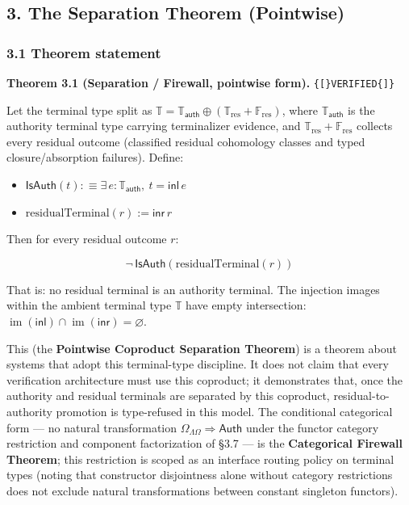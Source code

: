 \documentclass[
  10pt,
]{article}
\providecommand{\tightlist}{%
  \setlength{\itemsep}{0pt}\setlength{\parskip}{0pt}}
\providecommand{\tightlist}{%
  \setlength{\itemsep}{0pt}\setlength{\parskip}{0pt}}
\DeclareRobustCommand{\texttt}[1]{{\paperSymbolFont\nolinkurl{#1}}}
\begin{document}
\subsection{3. The Separation Theorem (Pointwise)}\label{the-separation-theorem-pointwise}

\subsubsection{3.1 Theorem statement}\label{theorem-statement}

\textbf{Theorem 3.1 (Separation / Firewall, pointwise form).} \texttt{{[}VERIFIED{]}}

Let the terminal type split as \protect\hypertarget{math-E0040-0055}{}{\(\mathbb{T} = \mathbb{T}_{\mathsf{auth}} \oplus (\mathbb{T}_{\mathrm{res}} + \mathbb{F}_{\mathrm{res}})\)}, where \protect\hypertarget{math-E0029-0056}{}{\(\mathbb{T}_{\mathsf{auth}}\)} is the authority terminal type carrying terminalizer evidence, and \protect\hypertarget{math-E0008-0057}{}{\(\mathbb{T}_{\mathrm{res}} + \mathbb{F}_{\mathrm{res}}\)} collects every residual outcome (classified residual cohomology classes and typed closure/absorption failures). Define:

\begin{itemize}
\tightlist
\item
  \protect\hypertarget{math-E0041-0058}{}{\(\mathsf{IsAuth}(t) :\equiv \exists\, e : \mathbb{T}_{\mathsf{auth}},\ t = \mathsf{inl}\,e\)}
\item
  \protect\hypertarget{math-E0042-0059}{}{\(\mathrm{residualTerminal}(r) := \mathsf{inr}\,r\)}
\end{itemize}

Then for every residual outcome \protect\hypertarget{math-E0043-0060}{}{\(r\)}:

\protect\hypertarget{math-E0044-0061}{}{\[\neg\,\mathsf{IsAuth}(\mathrm{residualTerminal}(r))\]}

That is: no residual terminal is an authority terminal. The injection images within the ambient terminal type \protect\hypertarget{math-E0045-0062}{}{\(\mathbb{T}\)} have empty intersection: \protect\hypertarget{math-E0046-0063}{}{\(\operatorname{im}(\mathsf{inl}) \cap \operatorname{im}(\mathsf{inr}) = \varnothing\)}.

This (the \textbf{Pointwise Coproduct Separation Theorem}) is a theorem about systems that adopt this terminal-type discipline. It does not claim that every verification architecture must use this coproduct; it demonstrates that, once the authority and residual terminals are separated by this coproduct, residual-to-authority promotion is type-refused in this model. The conditional categorical form --- no natural transformation \protect\hypertarget{math-E0047-0064}{}{\(\Omega_{\Lambda\Omega}\Rightarrow\mathsf{Auth}\)} under the functor category restriction and component factorization of §3.7 --- is the \textbf{Categorical Firewall Theorem}; this restriction is scoped as an interface routing policy on terminal types (noting that constructor disjointness alone without category restrictions does not exclude natural transformations between constant singleton functors).
\end{document}
